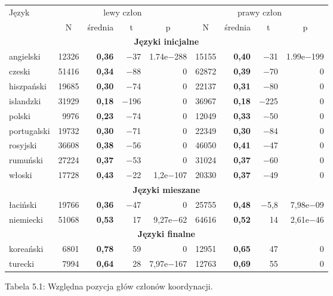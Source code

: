 \begin{table}[H]
\centering
\begin{tabular}{lrrrrrrrr}
  \toprule
Język & \multicolumn{4}{c}{lewy człon} & \multicolumn{4}{c}{prawy człon}\\
 & \multicolumn{1}{c}{N} & \multicolumn{1}{c}{średnia} & \multicolumn{1}{c}{t} & \multicolumn{1}{c}{p} & \multicolumn{1}{c}{N} & \multicolumn{1}{c}{średnia} & \multicolumn{1}{c}{t} & \multicolumn{1}{c}{p} \\ 
  \midrule
  \multicolumn{9}{c}{\textbf{Języki inicjalne}} \\
  \midrule
  angielski 	& 12326 	& \textbf{0,36} & $-$37 & 1.74e$-$288 & 15155 & \textbf{0,40} & $-$31 & 1.99e$-$199 \\
  czeski 	& 51416 	& \textbf{0,34} & $-$88 & 0 		& 62872 & \textbf{0,39} & $-$70 & 0 \\ 
  hiszpański	& 19685 & \textbf{0,30} & $-$74 & 0 		& 22137 & \textbf{0,31} & $-$80 & 0 \\ 
  islandzki 	& 31929 	& \textbf{0,18} & $-$196 & 0 		& 36967 & \textbf{0,18} & $-$225 & 0 \\ 
  polski 	& 9976 	& \textbf{0,23} & $-$74 & 0 		& 12049 & \textbf{0,33} & $-$50 & 0 \\ 
  portugalski & 19732 & \textbf{0,30} & $-$71 & 0 		& 22349 & \textbf{0,30} & $-$84 & 0 \\ 
  rosyjski 	& 36608 	& \textbf{0,38} & $-$56 & 0 		& 46050 & \textbf{0,41} & $-$47 & 0 \\ 
  rumuński 	& 27224 	& \textbf{0,37} & $-$53 & 0 		& 31024 & \textbf{0,37} & $-$60 & 0 \\ 
  włoski 	& 17728 	& \textbf{0,43} & $-$22 & 1,2e$-$107	& 20330 & \textbf{0,37} & $-$49 & 0 \\
  \midrule
  \multicolumn{9}{c}{\textbf{Języki mieszane}} \\
  \midrule
  łaciński 	& 19766 & \textbf{0,36}	& $-$47 & 0 		& 25755 & \textbf{0,48} & $-$5,8 & 7,98e$-$09 \\
  niemiecki & 51068 	& \textbf{0,53}	& 17 & 9,27e$-$62	& 64616 & \textbf{0,52} & 14 & 2,61e$-$46 \\ 
  \midrule
  \multicolumn{9}{c}{\textbf{Języki finalne}} \\
  \midrule
  koreański	& 6801 & \textbf{0,78} & 59 & 0 			& 12951 & \textbf{0,65} & 47 & 0 \\ 
  turecki 	& 7994 & \textbf{0,64} & 28 & 7,97e$-$167	& 12763 & \textbf{0,69} & 55 & 0 \\
  \bottomrule
\end{tabular}

\bigskip
Tabela 5.1: Względna pozycja głów członów koordynacji.
\end{table}